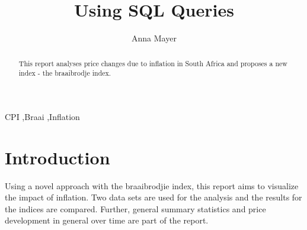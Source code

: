\documentclass[11pt,preprint, authoryear]{elsarticle}
\numberwithin{equation}{section}
\numberwithin{figure}{section}
\numberwithin{table}{section}
\begin{document}
\begin{frontmatter}  %

\title{Using SQL Queries}





\author[Add1]{Anna Mayer}





\address[Add1]{Stellenbosch University}


\begin{abstract}
\small{
This report analyses price changes due to inflation in South Africa and
proposes a new index - the braaibrodje index.
}
\end{abstract}

\vspace{1cm}


\begin{keyword}
\footnotesize{
CPI \sep Braai \sep Inflation \\
\vspace{0.3cm}
}
\end{keyword}



\vspace{0.5cm}

\end{frontmatter}

\setcounter{footnote}{0}



\pagestyle{fancy}
\chead{}
\rhead{}
\lfoot{}
\lhead{}
\cfoot{}


\headsep 35pt %




\hypertarget{introduction}{%
\section{\texorpdfstring{Introduction
\label{Introduction}}{Introduction }}\label{introduction}}

Using a novel approach with the braaibrodjie index, this report aims to
visualize the impact of inflation. Two data sets are used for the
analysis and the results for the indices are compared. Further, general
summary statistics and price development in general over time are part
of the report.
\end{document}
